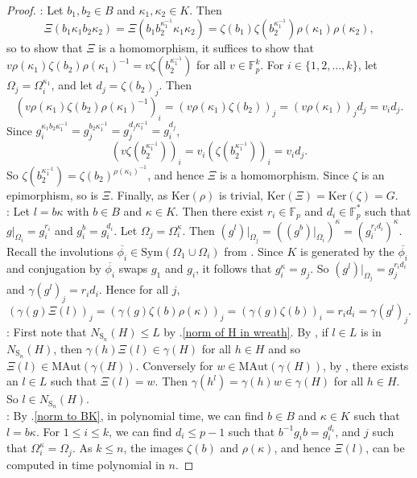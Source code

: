 \documentclass[11pt,a4paper]{article}
\theoremstyle{definition}
\theoremstyle{remark}
\newcommand{\Sym}[0]{\mathrm{Sym}}
\newcommand{\MAut}{\mathrm{MAut}}
\newcommand{\Sy}{\mathrm{S}}
\newcommand{\Ker}{\mathrm{Ker}}
\begin{document}
\begin{proof}
{:} Let $b_1, b_2 \in B$ and $\kappa_1, \kappa_2 \in K$.
Then \[\Xi(b_1 \kappa_1 b_2 \kappa_2) = \Xi(b_1 b_2^{\kappa_1^{-1}} \kappa_1 \kappa_2) = \zeta(b_1) \zeta(b_2^{\kappa_1^{-1}})\rho(\kappa_1) \rho(\kappa_2), \]
so to show that $\Xi$ is a homomorphism, it suffices to show that 
$v \rho(\kappa_1) \zeta(b_2){\rho(\kappa_1)^{-1}} = v\zeta(b_2^{\kappa_1^{-1}}) $ for all $v \in \mathds{F}_p^k$. 
For $i \in \{1,2, \ldots, k\}$, let $\Omega_j = \Omega_i^{\kappa_1}$, and let $d_j = \zeta(b_2)_j$.
Then 
\[ 
(v \rho(\kappa_1) \zeta(b_2){\rho(\kappa_1)^{-1}})_{i} = (v \rho(\kappa_1) \zeta(b_2))_{j} = (v \rho(\kappa_1))_{j}d_j = v_{i}d_j.
\]
Since $g_i^{\kappa_1 b_2 \kappa_1^{-1}} = g_j^{b_2 \kappa_1^{-1}} = g_j^{d_j \kappa_1^{-1}} =  g_i^{d_j}$, 
\[
(v \zeta(b_2^{\kappa_1^{-1}}))_{i} = v_{i} (\zeta(b_2^{\kappa_1^{-1}}))_i = v_{i} d_j. 
\]
So $\zeta(b_2^{\kappa_1^{-1}}) = \zeta(b_2)^{\rho(\kappa_1)^{-1}}$, 
and hence $\Xi$ is a homomorphism. 
Since $\zeta$ is an epimorphism, so is $\Xi$. 
Finally, as $\mathrm{Ker}(\rho)$ is trivial, $\Ker(\Xi) = \Ker(\zeta) = G$. \\
: 
Let $l= b \kappa$ with $b \in B$ and $\kappa \in K$. 
Then there exist $r_i \in \mathds{F}_p$ and $d_i \in \mathds{F}_p^*$ such that $g|_{\Omega_i} = g_i^{r_i}$ and $g_i^{b} = g_i^{d_i}$. 
Let $\Omega_j = \Omega_i^{\kappa} $. 
Then $(g^{l})|_{\Omega_j} =  ( (g^{b})|_{\Omega_i} )^{\kappa} =  (g_i^{r_id_i})^\kappa$. 
Recall the involutions $\overline{\phi_i} \in \Sym(\Omega_1 \cup \Omega_i)$ from . 
Since $K$ is generated by the $\overline{\phi_i}$ and conjugation by ${\overline{\phi_i}}$ swaps $g_1$ and $g_i$, it follows that $g_i^{\kappa} = g_j$.
So $(g^{l})|_{\Omega_j} = g_j^{r_id_i}$ and $\gamma(g^{l})_j = r_id_i$. Hence for all $j$, 
\[ 
(\gamma(g){\Xi(l)})_j  
= (\gamma(g){\zeta(b)\rho(\kappa) })_j  
= (\gamma(g){\zeta(b)})_i = r_id_i = \gamma(g^{l})_j.  
\]
: 
First note that $N_{\Sy_n}(H) \leq L$ by .\ref{norm of H in wreath}. 
By , if $l \in L$ is in $N_{\Sy_n}(H)$, then $\gamma(h)\Xi(l) \in \gamma(H)$ for all $h \in H$ and so $\Xi(l) \in \MAut(\gamma(H))$. 
Conversely for $w \in \MAut(\gamma(H))$, by , there exists an $l \in L$ such that $\Xi(l)= w$. Then $\gamma(h^{l}) = \gamma(h){w} \in \gamma(H)$ for all $h \in H$. So $l \in N_{\Sy_n}(H)$.  \\
: By .\ref{norm to BK}, in polynomial time, we can find $b \in B$ and $\kappa \in K$ such that $l=b\kappa$. 
For $1 \leq i \leq k$, we can find $d_i \leq p-1$ such that $b^{-1}g_ib = g_i^{d_i}$, and $j$ such that $\Omega_i^{\kappa} = \Omega_j$. As $k \leq n$, the images $\zeta(b)$ and $\rho(\kappa)$, and hence $\Xi(l)$, can be computed in time polynomial in $n$. 


\end{proof}
\end{document}
